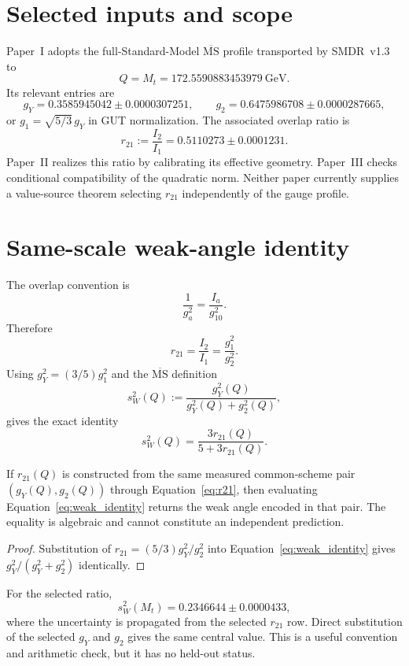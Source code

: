 \documentclass[11pt]{article}
\begin{document}
\section{Selected inputs and scope}

Paper~I adopts the full-Standard-Model $\overline{\mathrm{MS}}$ profile
transported by SMDR~v1.3 to
\[
Q=M_t=172.5590883453979~\mathrm{GeV}.
\]
Its relevant entries are
\[
g_Y=0.3585945042\pm0.0000307251,
\qquad
g_2=0.6475986708\pm0.0000287665,
\]
or $g_1=\sqrt{5/3}\,g_Y$ in GUT normalization. The associated overlap ratio is
\[
r_{21}:=\frac{I_2}{I_1}=0.5110273\pm0.0001231.
\]
Paper~II realizes this ratio by calibrating its effective geometry. Paper~III
checks conditional compatibility of the quadratic norm. Neither paper
currently supplies a value-source theorem selecting $r_{21}$ independently of
the gauge profile.

\section{Same-scale weak-angle identity}

The overlap convention is
\[
\frac{1}{g_a^2}=\frac{I_a}{g_{10}^2}.
\]
Therefore
\begin{equation}
r_{21}=\frac{I_2}{I_1}=\frac{g_1^2}{g_2^2}.
\label{eq:r21}
\end{equation}
Using $g_Y^2=(3/5)g_1^2$ and the $\overline{\mathrm{MS}}$ definition
\[
s_W^2(Q):=\frac{g_Y^2(Q)}{g_Y^2(Q)+g_2^2(Q)},
\]
gives the exact identity
\begin{equation}
\boxed{s_W^2(Q)=\frac{3r_{21}(Q)}{5+3r_{21}(Q)}.}
\label{eq:weak_identity}
\end{equation}

\begin{theorem}
If $r_{21}(Q)$ is constructed from the same measured common-scheme pair
$(g_Y(Q),g_2(Q))$ through Equation~\eqref{eq:r21}, then evaluating
Equation~\eqref{eq:weak_identity} returns the weak angle encoded in that pair.
The equality is algebraic and cannot constitute an independent prediction.
\end{theorem}

\begin{proof}
Substitution of $r_{21}=(5/3)g_Y^2/g_2^2$ into
Equation~\eqref{eq:weak_identity} gives
$g_Y^2/(g_Y^2+g_2^2)$ identically.
\end{proof}

For the selected ratio,
\begin{equation}
s_W^2(M_t)=0.2346644\pm0.0000433,
\end{equation}
where the uncertainty is propagated from the selected $r_{21}$ row. Direct
substitution of the selected $g_Y$ and $g_2$ gives the same central value. This
is a useful convention and arithmetic check, but it has no held-out status.
\end{document}
